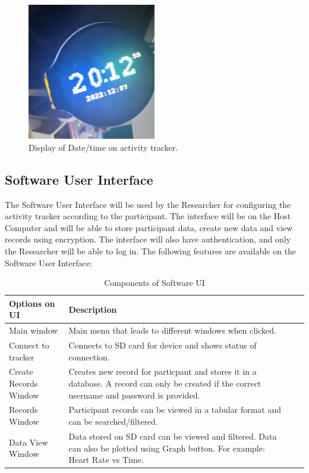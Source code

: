 \documentclass[12pt, titlepage]{article}
\begin{document}
\begin{figure}[H]
	\begin{center}
		 \includegraphics[width=0.5\textwidth]{DisplayTime}
		\caption{Display of Date/time on activity tracker.}
		\label{DisplayTime} 
	\end{center}
\end{figure}

\subsection{Software User Interface}

The Software User Interface will be used by the Researcher for configuring the activity tracker according to the participant. The interface will be on the Host Computer and will be able to store participant data, create new data and view records using encryption. The interface will also have authentication, and only the Researcher will be able to log in. The following features are available on the Software User Interface:

\begin{table}[H]
	\begin{tabularx}{1.05\textwidth} { 
		  | >{\centering\arraybackslash}X 
		  | >{\centering\arraybackslash}X 
		  | >{\centering\arraybackslash}X 
		  | >{\centering\arraybackslash}X | }
		 \hline
		 \textbf{Options on UI} & \textbf{Description}\\
		 \hline
		Main window & Main menu that leads to different windows when clicked.\\
		\hline
		 Connect to tracker  & Connects to SD card for device and shows status of connection.\\
		 \hline
		   Create Records Window & Creates new record for particpant and stores it in a database. A record can only be created if the correct username and password is provided. \\
		\hline 
		Records Window & Participant records can be viewed in a tabular format and can be searched/filtered.\\
		\hline
		Data View Window & Data stored on SD card can be viewed and filtered. Data can also be plotted using Graph button. For example: Heart Rate vs Time.\\
		\hline
	\end{tabularx}
\caption{\label{Software User Interface}Components of Software UI}  
\end{table}
\end{document}
